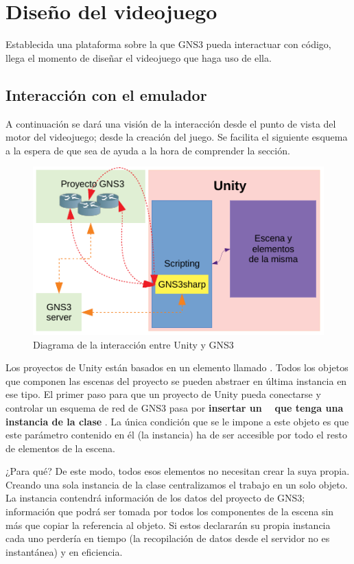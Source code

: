 \section{Diseño del videojuego}
Establecida una plataforma sobre la que GNS3 pueda interactuar con código, llega el momento de diseñar el videojuego que haga uso de ella. 

\subsection{Interacción con el emulador}\label{subsec:interac_emul}
A continuación se dará una visión de la interacción desde el punto de vista del motor del videojuego; desde la creación del juego. Se facilita el siguiente esquema a la espera de que sea de ayuda a la hora de comprender la sección.

\begin{figure}[H]
  \centering
  \includegraphics[scale=1.4]{imagenes/diagrama_interaccion}
  \caption{Diagrama de la interacción entre Unity y GNS3}
  \label{fig:diagrama_interaccion}
\end{figure}

Los proyectos de Unity están basados en un elemento llamado \GAOBJ. Todos los objetos que componen las escenas del proyecto se pueden abstraer en última instancia en ese tipo. El primer paso para que un proyecto de Unity pueda conectarse y controlar un esquema de red de GNS3 pasa por \textbf{insertar un \GAOBJ~ que tenga una instancia de la clase \GNSCS}. La única condición que se le impone a este objeto es que este parámetro contenido en él (la instancia) ha de ser accesible por todo el resto de elementos de la escena.

¿Para qué? De este modo, todos esos elementos no necesitan crear la suya propia. Creando una sola instancia de la clase centralizamos el trabajo en un solo objeto. La instancia contendrá información de los datos del proyecto de GNS3; información que podrá ser tomada por todos los componentes de la escena sin más que copiar la referencia al objeto. Si estos declararán su propia instancia cada uno perdería en tiempo (la recopilación de datos desde el servidor no es instantánea) y en eficiencia.

